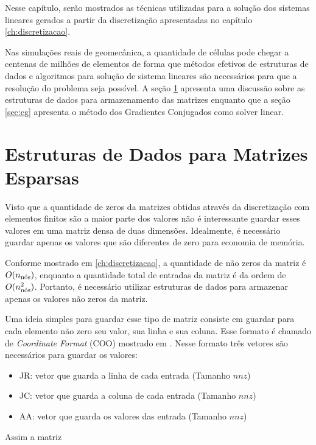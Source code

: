 

Nesse capítulo, serão mostrados as técnicas utilizadas para a solução dos sistemas lineares gerados a partir da discretização apresentadas no capítulo \ref{ch:discretizacao}.


Nas simulações reais de geomecânica, a quantidade de células pode chegar a centenas de milhões de elementos de forma que métodos efetivos de estruturas de dados e algoritmos para solução de sistema lineares são necessários para que a resolução do problema seja possível. A seção \ref{sec:csr} apresenta uma discussão sobre as estruturas de dados para armazenamento das matrizes enquanto que a seção \ref{sec:cg} apresenta o método dos Gradientes Conjugados como solver linear.


\section{Estruturas de Dados para Matrizes Esparsas} \label{sec:csr}


Visto que a quantidade de zeros da matrizes obtidas através da discretização com elementos finitos são a maior parte dos valores não é interessante guardar esses valores em uma matriz densa de duas dimensões. Idealmente, é necessário guardar apenas os valores que são diferentes de zero para economia de memória.

Conforme mostrado em \ref{ch:discretizacao}, a quantidade de não zeros da matriz é $O(\qtdnos)$, enquanto a quantidade total de entradas da matriz é da ordem de $O(\qtdnos^2)$. Portanto, é necessário utilizar estruturas de dados para armazenar apenas os valores não zeros da matriz. 


Uma ideia simples para guardar esse tipo de matriz consiste em guardar para cada elemento não zero seu valor, sua linha e sua coluna. Esse formato é chamado de \textit{Coordinate Format} (COO) mostrado em \citet{solverlinear}. Nesse formato três vetores são necessários para guardar os valores:


\begin{itemize}
    \item JR: vetor que guarda a linha de cada entrada (Tamanho $nnz$)
    \item JC: vetor que guarda a coluna de cada entrada (Tamanho $nnz$)
    \item AA: vetor que guarda os valores das entrada (Tamanho $nnz$)
\end{itemize}


Assim a matriz


